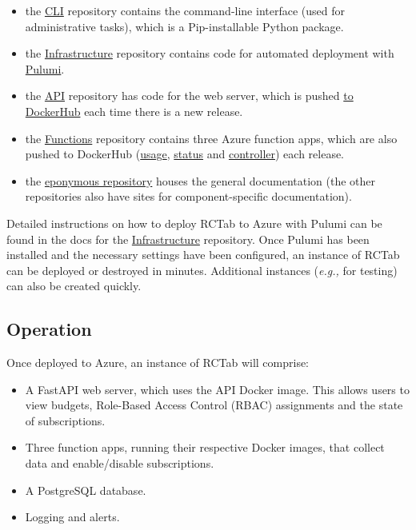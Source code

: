 \documentclass{article}
\providecommand{\tightlist}{%
  \setlength{\itemsep}{0pt}\setlength{\parskip}{0pt}}
\begin{document}
\begin{itemize}
\tightlist
\item
  the \href{https://github.com/alan-turing-institute/rctab-cli}{CLI}
  repository contains the command-line interface (used for
  administrative tasks), which is a Pip-installable Python package.
\item
  the
  \href{https://github.com/alan-turing-institute/rctab-infrastructure}{Infrastructure}
  repository contains code for automated deployment with
  \href{https://www.pulumi.com/}{Pulumi}.
\item
  the \href{https://github.com/alan-turing-institute/rctab-api}{API}
  repository has code for the web server, which is pushed
  \href{https://hub.docker.com/r/turingrc/rctab-api}{to DockerHub} each
  time there is a new release.
\item
  the
  \href{https://github.com/alan-turing-institute/rctab-functions}{Functions}
  repository contains three Azure function apps, which are also pushed
  to DockerHub
  (\href{https://hub.docker.com/r/turingrc/rctab-usage}{usage},
  \href{https://hub.docker.com/r/turingrc/rctab-status}{status} and
  \href{https://hub.docker.com/r/turingrc/rctab-controller}{controller})
  each release.
\item
  the \href{https://github.com/alan-turing-institute/rctab}{eponymous
  repository} houses the general documentation (the other repositories
  also have sites for component-specific documentation).
\end{itemize}

Detailed instructions on how to deploy RCTab to Azure with Pulumi can be
found in the docs for the
\href{https://github.com/alan-turing-institute/rctab-infrastructure}{Infrastructure}
repository. Once Pulumi has been installed and the necessary settings
have been configured, an instance of RCTab can be deployed or destroyed
in minutes. Additional instances (\textit{e.g.,} for testing) can also be created
quickly.

\subsection{Operation}\label{operation}

Once deployed to Azure, an instance of RCTab will comprise:

\begin{itemize}
\tightlist
\item
  A FastAPI web server, which uses the API Docker image. This allows
  users to view budgets, Role-Based Access Control (RBAC) assignments
  and the state of subscriptions.
\item
  Three function apps, running their respective Docker images, that
  collect data and enable/disable subscriptions.
\item
  A PostgreSQL database.
\item
  Logging and alerts.
\end{itemize}
\end{document}

